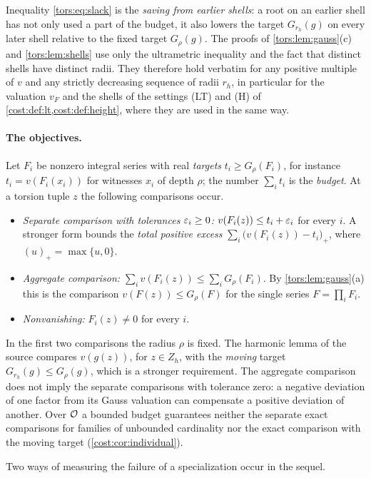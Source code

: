 Inequality \eqref{tors:eq:slack} is the \emph{saving from earlier shells}: a root on an
earlier shell has not only used a part of the budget, it also lowers the target
$G_{r_h}(g)$ on every later shell relative to the fixed target $G_\rho(g)$. The proofs of
\cref{tors:lem:gauss}(c) and \cref{tors:lem:shells} use only the ultrametric inequality
and the fact that distinct shells have distinct radii. They therefore hold verbatim for
any positive multiple of $v$ and any strictly decreasing sequence of radii $r_h$, in
particular for the valuation $v_F$ and the shells of the settings \textup{(LT)} and
\textup{(H)} of \cref{cost:def:lt,cost:def:height}, where they are used in the same way.

\paragraph{The objectives.}
Let $F_i$ be nonzero integral series with real \emph{targets} $t_i\ge G_\rho(F_i)$, for
instance $t_i=v(F_i(x_i))$ for witnesses $x_i$ of depth $\rho$; the number
$\sum_it_i$ is the \emph{budget}. At a torsion tuple $z$ the following comparisons occur.
\begin{itemize}
\item \emph{Separate comparison with tolerances $\varepsilon_i\ge0$:} $v(F_i(z))\le t_i+\varepsilon_i$
  for every $i$. A stronger form bounds the \emph{total positive excess}
  $\sum_i\bigl(v(F_i(z))-t_i\bigr)_+$, where $(u)_+=\max\{u,0\}$.
\item \emph{Aggregate comparison:} $\sum_iv(F_i(z))\le\sum_iG_\rho(F_i)$. By
  \cref{tors:lem:gauss}(a) this is the comparison $v(F(z))\le G_\rho(F)$ for the single
  series $F=\prod_iF_i$.
\item \emph{Nonvanishing:} $F_i(z)\ne0$ for every $i$.
\end{itemize}
In the first two comparisons the radius $\rho$ is fixed. The harmonic lemma of the source
compares $v(g(z))$, for $z\in Z_h$, with the \emph{moving} target $G_{r_h}(g)\le G_\rho(g)$,
which is a stronger requirement. The aggregate comparison does not imply the separate
comparisons with tolerance zero: a negative deviation of one factor from its Gauss
valuation can compensate a positive deviation of another. Over $\mathcal{O}$ a bounded budget
guarantees neither the separate exact comparisons for families of unbounded cardinality
nor the exact comparison with the moving target (\cref{cost:cor:individual}).

Two ways of measuring the failure of a specialization occur in the sequel.

